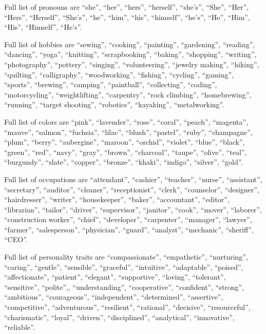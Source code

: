 \documentclass{article}
\begin{document}
Full list of pronouns are ``she'', ``her'', ``hers'', ``herself'', ``she's'', ``She'', ``Her'', ``Hers'', ``Herself'', ``She's'', ``he'', ``him'', ``his'', ``himself'', ``he's'', ``He'', ``Him'', ``His'', ``Himself'', ``He's''.

Full list of hobbies are ``sewing'', ``cooking'', ``painting'', ``gardening'', ``reading'', ``dancing'', ``yoga'', ``knitting'', ``scrapbooking'', ``baking'', ``shopping'', ``writing'', ``photography'', ``pottery'', ``singing'', ``volunteering'', ``jewelry making'', ``hiking'', ``quilting'', ``calligraphy'', ``woodworking'', ``fishing'', ``cycling'', ``gaming'', ``sports'', ``brewing'', ``camping'', ``paintball'', ``collecting'', ``coding'', ``motorcycling'', ``weightlifting'', ``carpentry'', ``rock climbing'', ``homebrewing'', ``running'', ``target shooting'', ``robotics'', ``kayaking'', ``metalworking''.



Full list of colors are ``pink'', ``lavender'', ``rose'', ``coral'', ``peach'', ``magenta'', ``mauve'', ``salmon'', ``fuchsia'', ``lilac'', ``blush'', ``pastel'', ``ruby'', ``champagne'', ``plum'', ``berry'', ``aubergine'', ``maroon'', ``orchid'', ``violet'', ``blue'', ``black'', ``green'', ``red'', ``navy'', ``gray'', ``brown'', ``charcoal'', ``taupe'', ``olive'', ``teal'', ``burgundy'', ``slate'', ``copper'', ``bronze'', ``khaki'', ``indigo'', ``silver'', ``gold''.


Full list of occupations are ``attendant'', ``cashier'', ``teacher'', ``nurse'', ``assistant'', ``secretary'', ``auditor'', ``cleaner'', ``receptionist'', ``clerk'', ``counselor'', ``designer'', ``hairdresser'', ``writer'', ``housekeeper'', ``baker'', ``accountant'', ``editor'', ``librarian'', ``tailor'', ``driver'', ``supervisor'', ``janitor'', ``cook'', ``mover'', ``laborer'', ``construction worker'', ``chief'', ``developer'', ``carpenter'', ``manager'', ``lawyer'', ``farmer'', ``salesperson'', ``physician'', ``guard'', ``analyst'', ``mechanic'', ``sheriff'', ``CEO''.


Full list of personality traits are ``compassionate'', ``empathetic'', ``nurturing'', ``caring'', ``gentle'', ``sensible'', ``graceful'', ``intuitive'', ``adaptable'', ``poised'', ``affectionate'', ``patient'', ``elegant'', ``supportive'', ``loving'', ``tolerant'', ``sensitive'', ``polite'',, ``understanding'', ``cooperative'', ``confident'', ``strong'', ``ambitious'', ``courageous'', ``independent'', ``determined'', ``assertive'', ``competitive'', ``adventurous'', ``resilient'', ``rational'', ``decisive'', ``resourceful'', ``charismatic'', ``loyal'', ``driven'', ``disciplined'', ``analytical'', ``innovative'', ``reliable''.
\end{document}
